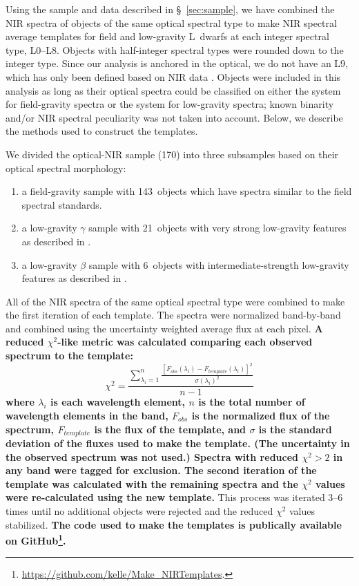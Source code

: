 \documentclass[12pt]{aastex6}
\newcommand{\sample}{170}
\newcommand{\optField}{143}
\newcommand{\optBeta}{6}
\newcommand{\optGamma}{21}
\begin{document}
Using the sample and data described in \S~\ref{sec:sample}, we have combined the NIR spectra of objects of the same optical spectral type to make NIR spectral average templates for field and low-gravity L~dwarfs at each integer spectral type, L0--L8. Objects with half-integer spectral types were rounded down to the integer type.
Since our analysis is anchored in the optical, we do not have an L9, which has only been defined based on NIR data \citep{K99,Geballe02}.
Objects were included in this analysis as long as their optical spectra could be classified on either the \citet{K99} system for field-gravity spectra or the \citet{Cruz09_lowg} system for low-gravity spectra; known binarity and/or NIR spectral peculiarity was not taken into account.
Below, we describe the methods used to construct the templates.

We divided the optical-NIR sample (\sample) into three subsamples based on their optical spectral morphology:
\begin{enumerate}
	\item a field-gravity sample with \optField~objects which have spectra similar to the \citet{K99} field spectral standards.
	\item a low-gravity $\gamma$ sample with \optGamma~objects with very strong low-gravity features as described in \citet{Cruz09_lowg}.
	\item a low-gravity $\beta$ sample with \optBeta~objects with intermediate-strength low-gravity features as described in \citet{Cruz09_lowg}.
\end{enumerate}

All of the NIR spectra of the same optical spectral type were combined to make the first iteration of each template.
The spectra were normalized band-by-band and combined using the uncertainty weighted average flux at each pixel.
\textbf{
A reduced $\chi^2$-like metric was calculated comparing each observed spectrum to the template:}
\begin{equation}
\chi^2=\frac{\sum_{\lambda_i=1}^{n} \frac{[F_{obs}(\lambda_i) - F_{template}(\lambda_i)]^2}{\sigma(\lambda_i)^2}}{n-1}
\end{equation}
\textbf{where $\lambda_i$ is each wavelength element, $n$ is the total number of wavelength elements in the band, $F_{obs}$ is the normalized flux of the spectrum, $F_{template}$ is the flux of the template, and $\sigma$ is the standard deviation of the fluxes used to make the template. (The uncertainty in the observed spectrum was not used.)
Spectra with reduced $\chi^2 > 2$ in any band were tagged for exclusion.
The second iteration of the template was calculated with the remaining spectra and the $\chi^2$ values were re-calculated using the new template.}
This process was iterated 3--6 times until no additional objects were rejected and the reduced $\chi^2$ values stabilized. \textbf{The code used to make the templates is publically available on GitHub\footnote{\url{https://github.com/kelle/Make_NIRTemplates}.}.}
\end{document}
